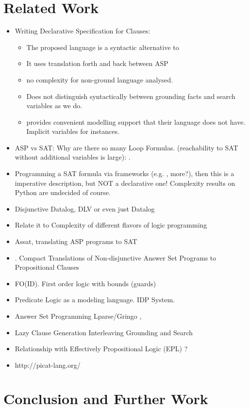 \documentclass[runningheads]{llncs}
\begin{document}
\section{Related Work}
 \begin{itemize}
     \item Writing Declarative Specification for Clauses: \cite{Gebser16} 
         \begin{itemize}
             \item The proposed language is a syntactic alternative to \bcore
             \item It uses translation forth and back between ASP
             \item no complexity for non-ground language analysed. 
             \item Does not distinguish syntactically between grounding facts and search variables as we do. 
             \item \bnice provides convenient modelling support that their language does not have. Implicit variables for instances. 
         \end{itemize}
     \item ASP vs SAT: Why are there so many Loop Formulas. (reachability to SAT without additional variables is large): \cite{Lifschitz04} .
     \item Programming a SAT formula via frameworks (e.g. \cite{Pysat18},
         more?), then this is a imperative description, but NOT a declarative
         one! Complexity results on Python are undecided of course. 
     \item Disjunctive Datalog, DLV \cite{Eiter97} or even just Datalog \cite{Gottlob89}
     \item Relate it to Complexity of different flavors of logic programming \cite{Gottlob01}
     \item Assat, translating ASP programs to SAT \cite{Lin04}
     \item \cite{Janhunen11}. Compact Translations of Non-disjunctive Answer Set
         Programs to Propositional Clauses
     \item FO(ID). First order logic with bounds (guards) \cite{Wittocx10}
     \item Predicate Logic as a modeling language. IDP System. \cite{Cat18}
     \item Answer Set Programming Lparse/Gringo \cite{Gebser15}, \cite{Ferraris05}
     \item Lazy Clause Generation Interleaving Grounding and Search \cite{Cat15}
     \item Relationship with Effectively Propositional Logic (EPL) \cite{Moura08}? 
     \item http://picat-lang.org/
 \end{itemize}

\section{Conclusion and Further Work}



\end{document}
